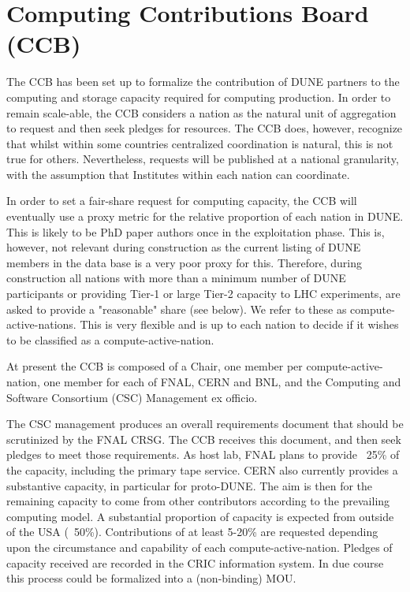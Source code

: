 \documentclass[../main-v1.tex]{subfiles}
\begin{document}
\chapter{Computing Contributions Board (CCB) }
\label{ch:ccb}


The CCB has been set up to formalize the contribution of DUNE partners to the computing and storage capacity required for computing production. In order to remain scale-able, the CCB considers a nation as the natural unit of aggregation to request and then seek pledges for resources. The CCB does, however, recognize that whilst within some countries centralized coordination is natural, this is not true for others. Nevertheless, requests will be published at a national granularity, with the assumption that Institutes within each nation can coordinate.

In order to set a fair-share request for computing capacity, the CCB will eventually use a proxy metric for the relative proportion of each nation in DUNE. This is likely to be PhD paper authors once in the exploitation phase. This is, however, not relevant during construction as the current listing of DUNE members in the data base is a very poor proxy for this. Therefore, during construction all nations with more than a minimum number of DUNE participants or providing Tier-1 or large Tier-2 capacity to LHC experiments, are asked to provide a "reasonable" share (see below). We refer to these as compute-active-nations.
This is very flexible and is up to each nation to decide if it wishes to be classified as a compute-active-nation.

At present the CCB is composed of a Chair, one member per compute-active-nation, one member for each of FNAL, CERN and BNL, and the Computing and Software Consortium (CSC) Management ex officio.

The CSC management produces an overall requirements document that should be scrutinized by the FNAL CRSG. The CCB receives this document, and then seek pledges to meet those requirements. As host lab, FNAL plans to provide ~25\% of the capacity, including the primary tape service.
CERN also currently provides a substantive capacity, in particular for proto-DUNE.
The aim is then for the remaining capacity to come from other contributors according to the prevailing computing model. A substantial proportion of capacity is expected from outside of the USA  (~50\%). Contributions of at least 5-20\% are requested depending upon the circumstance and capability of each compute-active-nation.
Pledges of capacity received are recorded in the CRIC information system. In due course this process could be formalized into a (non-binding) MOU.
\end{document}
